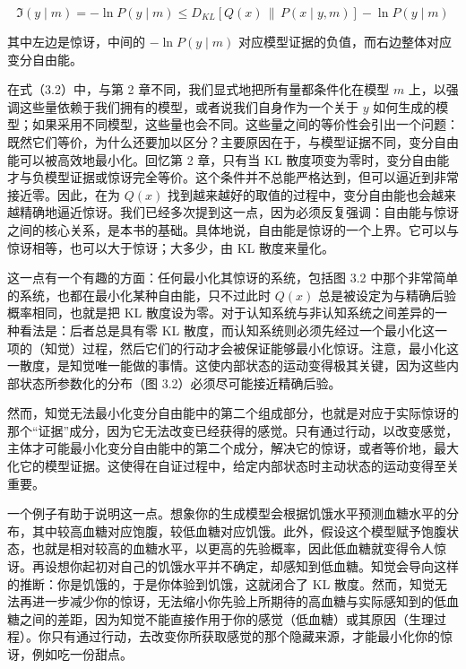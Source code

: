 \begin{equation}
\Im(y\mid m) = -\ln P(y\mid m) \leq D_{KL}[Q(x)\,\|\,P(x\mid y,m)] - \ln P(y\mid m)
\tag{3.2}
\end{equation}

其中左边是惊讶，中间的 $-\ln P(y\mid m)$ 对应模型证据的负值，而右边整体对应变分自由能。

在式（3.2）中，与第 2 章不同，我们显式地把所有量都条件化在模型 $m$ 上，以强调这些量依赖于我们拥有的模型，或者说我们自身作为一个关于 $y$ 如何生成的模型；如果采用不同模型，这些量也会不同。这些量之间的等价性会引出一个问题：既然它们等价，为什么还要加以区分？主要原因在于，与模型证据不同，变分自由能可以被高效地最小化。回忆第 2 章，只有当 KL 散度项变为零时，变分自由能才与负模型证据或惊讶完全等价。这个条件并不总能严格达到，但可以逼近到非常接近零。因此，在为 $Q(x)$ 找到越来越好的取值的过程中，变分自由能也会越来越精确地逼近惊讶。我们已经多次提到这一点，因为必须反复强调：自由能与惊讶之间的核心关系，是本书的基础。具体地说，自由能是惊讶的一个上界。它可以与惊讶相等，也可以大于惊讶；大多少，由 KL 散度来量化。

这一点有一个有趣的方面：任何最小化其惊讶的系统，包括图 3.2 中那个非常简单的系统，也都在最小化某种自由能，只不过此时 $Q(x)$ 总是被设定为与精确后验概率相同，也就是把 KL 散度设为零。对于认知系统与非认知系统之间差异的一种看法是：后者总是具有零 KL 散度，而认知系统则必须先经过一个最小化这一项的（知觉）过程，然后它们的行动才会被保证能够最小化惊讶。注意，最小化这一散度，是知觉唯一能做的事情。这使内部状态的运动变得极其关键，因为这些内部状态所参数化的分布（图 3.2）必须尽可能接近精确后验。

然而，知觉无法最小化变分自由能中的第二个组成部分，也就是对应于实际惊讶的那个“证据”成分，因为它无法改变已经获得的感觉。只有通过行动，以改变感觉，主体才可能最小化变分自由能中的第二个成分，解决它的惊讶，或者等价地，最大化它的模型证据。这使得在自证过程中，给定内部状态时主动状态的运动变得至关重要。

一个例子有助于说明这一点。想象你的生成模型会根据饥饿水平预测血糖水平的分布，其中较高血糖对应饱腹，较低血糖对应饥饿。此外，假设这个模型赋予饱腹状态，也就是相对较高的血糖水平，以更高的先验概率，因此低血糖就变得令人惊讶。再设想你起初对自己的饥饿水平并不确定，却感知到低血糖。知觉会导向这样的推断：你是饥饿的，于是你体验到饥饿，这就闭合了 KL 散度。然而，知觉无法再进一步减少你的惊讶，无法缩小你先验上所期待的高血糖与实际感知到的低血糖之间的差距，因为知觉不能直接作用于你的感觉（低血糖）或其原因（生理过程）。你只有通过行动，去改变你所获取感觉的那个隐藏来源，才能最小化你的惊讶，例如吃一份甜点。

